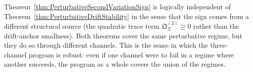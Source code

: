 \begin{remark}\label{rem:IndependenceFirstVariation}
Theorem~\ref{thm:PerturbativeSecondVariationSign} is logically independent of Theorem~\ref{thm:PerturbativeDriftStability} in the sense that the sign comes from a different structural source (the quadratic trace term $\mathfrak Q_\Sigma^{(2)}\ge0$ rather than the drift-anchor smallness). Both theorems cover the same perturbative regime, but they do so through different channels. This is the sense in which the three-channel program is robust: even if one channel were to fail in a regime where another succeeds, the program as a whole covers the union of the regimes.
\end{remark}
